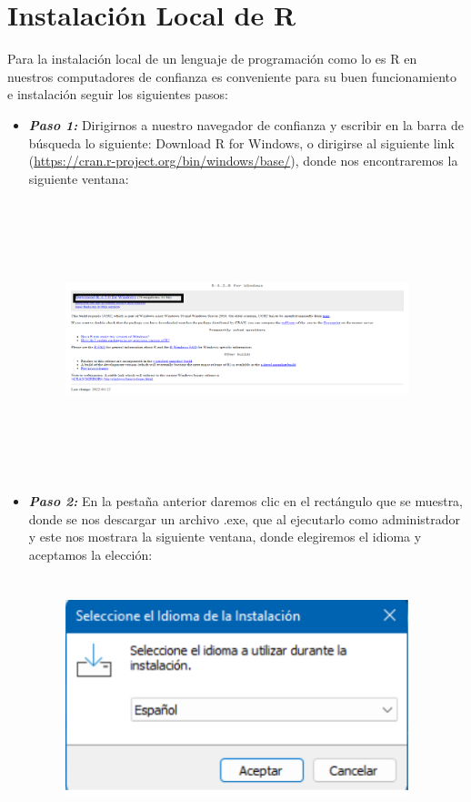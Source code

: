 \documentclass{article}
\begin{document}
\section{Instalación Local de R}
Para la instalación local de un lenguaje de programación como lo es R en nuestros computadores de confianza  es conveniente  para su buen funcionamiento e instalación seguir los siguientes pasos: 
\begin{itemize}
\item \textbf{\textit{Paso 1: }} Dirigirnos a nuestro navegador de confianza y escribir en la barra de búsqueda lo siguiente: Download R for Windows, o dirigirse al siguiente link (\url{https://cran.r-project.org/bin/windows/base/}), donde nos encontraremos la siguiente ventana: 
\begin{figure}[H]
\centering
\includegraphics[width=10cm,height=8cm]{imagenes/Paso1.png}
\caption{\label{fig0}}
\end{figure}
\item \textbf{\textit{Paso 2: }}En la pestaña anterior daremos clic en el rectángulo que se muestra, donde se nos descargar un archivo .exe, que al ejecutarlo como administrador y este nos mostrara  la siguiente ventana, donde  elegiremos el idioma y aceptamos la elección:
\begin{figure}[H]
\centering
\includegraphics[width=10cm,height=7cm]{imagenes/Paso2.png}

\end{figure}
\end{itemize}
\end{document}
